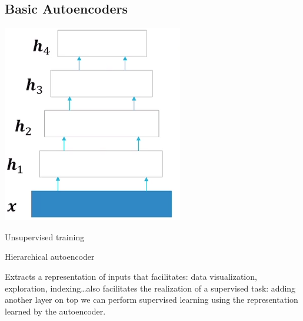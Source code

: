 \documentclass[10pt]{report}
\begin{document}
\subsection{Basic Autoencoders}
\begin{center}
	\includegraphics[scale=0.5]{79.png}
\end{center}
\begin{list}{}{}
	\item Unsupervised training
	\item Hierarchical autoencoder
	\item Extracts a representation of inputs that facilitates: data visualization, exploration, indexing\ldots also facilitates the realization of a supervised task: adding another layer on top we can perform supervised learning using the representation learned by the autoencoder.
\end{list}
\end{document}
